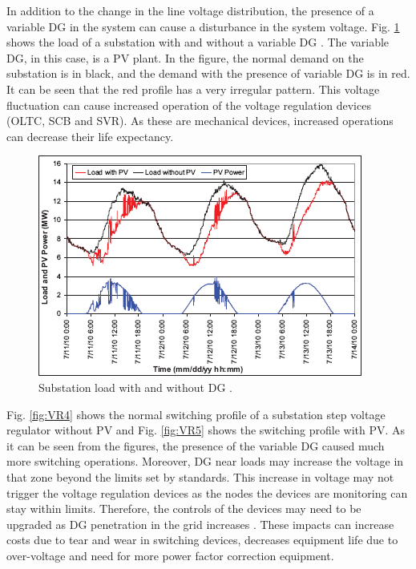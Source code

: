 In addition to the change in the line voltage distribution, the presence of a variable DG in the system can cause a disturbance in the system voltage. Fig. \ref{fig:VR3} shows the load of a substation with and without a variable DG \cite{GKA11}. The variable DG, in this case, is a PV plant. In the figure, the normal demand on the substation is in black, and the demand with the presence of variable DG is in red. It can be seen that the red profile has a very irregular pattern. This voltage fluctuation can cause increased operation of the voltage regulation devices (OLTC, SCB and SVR). As these are mechanical devices, increased operations can decrease their life expectancy.
 
\begin{figure}[!h]
\centering
\includegraphics[width=0.7\linewidth]{figs/VR3.png}
\caption[Substation load with and without DG.]{Substation load with and without DG \cite{GKA11}.}
\label{fig:VR3}
\end{figure}
 

Fig. \ref{fig:VR4} shows the normal switching profile of a substation step voltage regulator without PV and Fig. \ref{fig:VR5} shows the switching profile with PV. As it can be seen from the figures, the presence of the variable DG caused much more switching operations. Moreover, DG near loads may increase the voltage in that zone beyond the limits set by standards. This increase in voltage may not trigger the voltage regulation devices as the nodes the devices are monitoring can stay within limits. Therefore, the controls of the devices may need to be upgraded as DG penetration in the grid increases \cite{IEE13}. These impacts can increase costs due to tear and wear in switching devices, decreases equipment life due to over-voltage and need for more power factor correction equipment. 

